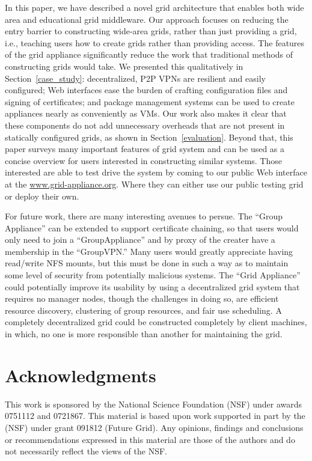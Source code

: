 \documentclass[conference]{IEEEtran}
\begin{document}
In this paper, we have described a novel grid architecture that enables both
wide area and educational grid middleware.  Our approach focuses on reducing
the entry barrier to constructing wide-area grids, rather than just providing a
grid, i.e., teaching users how to create grids rather than providing access.
The features of the grid appliance significantly reduce the work that
traditional methods of constructing grids would take.  We presented this
qualitatively in Section~\ref{case_study}:  decentralized, P2P VPNs are
resilient and easily configured; Web interfaces ease the burden of crafting
configuration files and signing of certificates; and package management systems
can be used to create appliances nearly as conveniently as VMs.  Our work also
makes it clear that these components do not add unnecessary overheads that are
not present in statically configured grids, as shown in
Section~\ref{evaluation}.  Beyond that, this paper surveys many important
features of grid system and can be used as a concise overview for users
interested in constructing similar systems.  Those interested are able to test
drive the system by coming to our public Web interface at the
\url{www.grid-appliance.org}.  Where they can either use our public testing
grid or deploy their own.

For future work, there are many interesting avenues to persue.  The ``Group
Appliance'' can be extended to support certificate chaining, so that users
would only need to join a ``GroupAppliance'' and by proxy of the creater have
a membership in the ``GroupVPN.''  Many users would greatly appreciate having
read/write NFS mounts, but this must be done in such a way as to maintain some
level of security from potentially malicious systems.  The ``Grid Appliance''
could potentially improve its usability by using a decentralized grid system
that requires no manager nodes, though the challenges in doing so, are
efficient resource discovery, clustering of group resources, and fair use
scheduling.  A completely decentralized grid could be constructed completely by
client machines, in which, no one is more responsible than another for
maintaining the grid.

\section*{Acknowledgments}

This work is sponsored by the National Science Foundation (NSF) under awards
0751112 and 0721867.  This material is based upon work supported in part by the
(NSF) under grant 091812 (Future Grid).  Any opinions, findings and conclusions
or recommendations expressed in this material are those of the authors and do
not necessarily reflect the views of the NSF.



\end{document}
